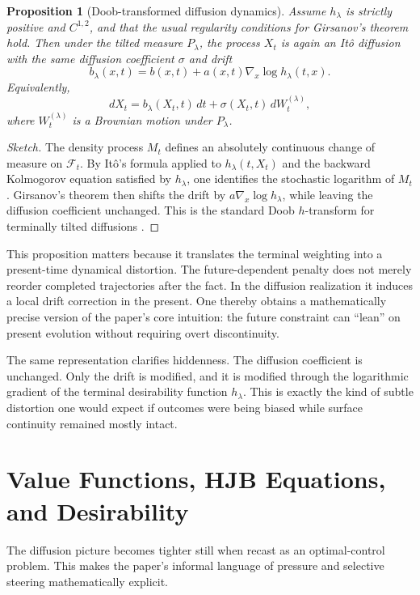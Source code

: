 \documentclass[12pt]{article}
\newtheorem{proposition}{Proposition}
\begin{document}
\begin{proposition}[Doob-transformed diffusion dynamics]
Assume $h_\lambda$ is strictly positive and $C^{1,2}$, and that the usual regularity conditions for Girsanov's theorem hold. Then under the tilted measure $P_\lambda$, the process $X_t$ is again an It\^o diffusion with the same diffusion coefficient $\sigma$ and drift
\[
b_\lambda(x,t) = b(x,t) + a(x,t)\nabla_x \log h_\lambda(t,x).
\]
Equivalently,
\[
dX_t = b_\lambda(X_t,t)\,dt + \sigma(X_t,t)\,dW_t^{(\lambda)},
\]
where $W_t^{(\lambda)}$ is a Brownian motion under $P_\lambda$.
\end{proposition}

\begin{proof}[Sketch]
The density process $M_t$ defines an absolutely continuous change of measure on $\mathcal F_t$. By It\^o's formula applied to $h_\lambda(t,X_t)$ and the backward Kolmogorov equation satisfied by $h_\lambda$, one identifies the stochastic logarithm of $M_t$. Girsanov's theorem then shifts the drift by $a\nabla_x \log h_\lambda$, while leaving the diffusion coefficient unchanged. This is the standard Doob $h$-transform for terminally tilted diffusions \cite{doob1957, karatzas1991, oksendal2003}.
\end{proof}

This proposition matters because it translates the terminal weighting into a present-time dynamical distortion. The future-dependent penalty does not merely reorder completed trajectories after the fact. In the diffusion realization it induces a local drift correction in the present. One thereby obtains a mathematically precise version of the paper's core intuition: the future constraint can ``lean'' on present evolution without requiring overt discontinuity.

The same representation clarifies hiddenness. The diffusion coefficient is unchanged. Only the drift is modified, and it is modified through the logarithmic gradient of the terminal desirability function $h_\lambda$. This is exactly the kind of subtle distortion one would expect if outcomes were being biased while surface continuity remained mostly intact.

\section{Value Functions, HJB Equations, and Desirability}

The diffusion picture becomes tighter still when recast as an optimal-control problem. This makes the paper's informal language of pressure and selective steering mathematically explicit.
\end{document}
